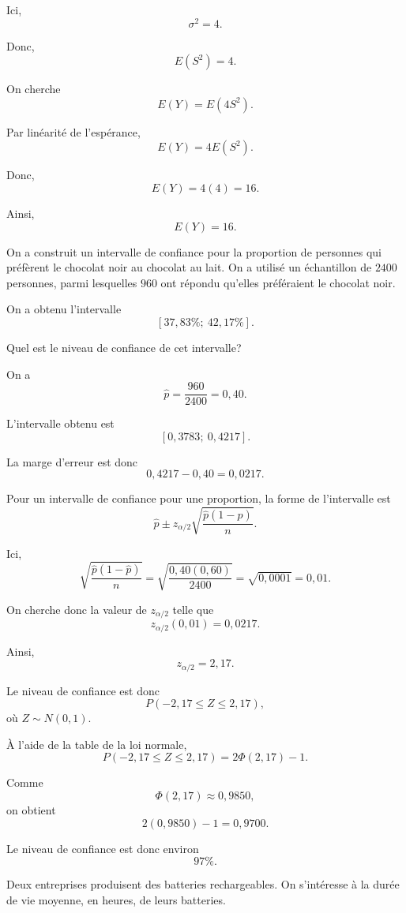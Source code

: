 \begin{questions}
\begin{solution}
Ici,
\[
\sigma^2=4.
\]

Donc,
\[
E(S^2)=4.
\]

On cherche
\[
E(Y)=E(4S^2).
\]

Par linéarité de l'espérance,
\[
E(Y)=4E(S^2).
\]

Donc,
\[
E(Y)=4(4)=16.
\]

Ainsi,
\[
\boxed{E(Y)=16.}
\]
\end{solution}

\newpage

\question[10]
On a construit un intervalle de confiance pour la proportion de personnes qui préfèrent le chocolat noir au chocolat au lait. On a utilisé un échantillon de \(2400\) personnes, parmi lesquelles \(960\) ont répondu qu'elles préféraient le chocolat noir.

On a obtenu l'intervalle
\[
[37{,}83\%;\ 42{,}17\%].
\]

Quel est le niveau de confiance de cet intervalle?

\begin{solution}
On a
\[
\hat{p}=\frac{960}{2400}=0{,}40.
\]

L'intervalle obtenu est
\[
[0{,}3783;\ 0{,}4217].
\]

La marge d'erreur est donc
\[
0{,}4217-0{,}40=0{,}0217.
\]

Pour un intervalle de confiance pour une proportion, la forme de l'intervalle est
\[
\hat{p}\pm z_{\alpha/2}\sqrt{\frac{\hat{p}(1-\hat{p})}{n}}.
\]

Ici,
\[
\sqrt{\frac{\hat{p}(1-\hat{p})}{n}}
=
\sqrt{\frac{0{,}40(0{,}60)}{2400}}
=
\sqrt{0{,}0001}
=
0{,}01.
\]

On cherche donc la valeur de \(z_{\alpha/2}\) telle que
\[
z_{\alpha/2}(0{,}01)=0{,}0217.
\]

Ainsi,
\[
z_{\alpha/2}=2{,}17.
\]

Le niveau de confiance est donc
\[
P(-2{,}17\leq Z\leq 2{,}17),
\]
où \(Z\sim N(0,1)\).

À l'aide de la table de la loi normale,
\[
P(-2{,}17\leq Z\leq 2{,}17)
=
2\Phi(2{,}17)-1.
\]

Comme
\[
\Phi(2{,}17)\approx 0{,}9850,
\]
on obtient
\[
2(0{,}9850)-1=0{,}9700.
\]

Le niveau de confiance est donc environ
\[
\boxed{97\%.}
\]
\end{solution}

\newpage
\question[10]
Deux entreprises produisent des batteries rechargeables. On s'intéresse à la durée de vie moyenne, en heures, de leurs batteries.


\end{questions}
